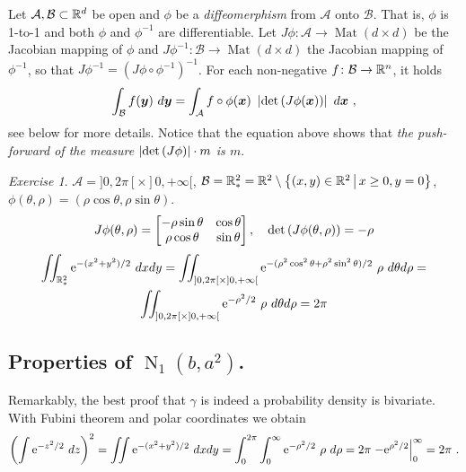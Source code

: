 \documentclass[12pt,a4paper]{amsart}
\newcommand{\Mof}[1]{\operatorname{Mat}\left(#1\times#1\right)}
\newcommand{\by}{\bm y}
\newcommand{\gaussian}[3]{\operatorname{N}_{#1}\left(#2,#3\right)}
\theoremstyle{plain}%
\theoremstyle{definition}
\theoremstyle{remark}
\newtheorem{exercise}{Exercise}
\begin{document}
Let $\mathcal A, \mathcal B \subset \mathbb{R}^d$ be open and $\phi$ be a
\emph{diffeomerphism} from $\mathcal A$ onto $\mathcal B$. That is,
$\phi$ is 1-to-1 and both $\phi$ and $\phi^{-1}$ are differentiable.
Let $J\phi \colon \mathcal A \to \Mof d$ be the Jacobian mapping of
$\phi$ and $J\phi^{-1} \colon \mathcal B \to \Mof d$ the Jacobian
mapping of $\phi^{-1}$, so that
$J\phi^{-1} = \left(J\phi\circ \phi^{-1}\right)^{-1}$. For each
non-negative $f \colon \mathcal B \to \mathbb{R}^n$, it holds
  \begin{equation*}\label{eq:change}
    \int_{\mathcal B} f(\by) \ d\by = \int_{\mathcal A} f\circ\phi(\bx) \ \absoluteval{\detof{J\phi(\bx)}} \ d\bx \ ,
  \end{equation*}
  see below for more details. Notice that the equation above shows that \emph{the push-forward of the measure $\left\vert\operatorname{det}\left(J\phi\right)\right\vert \cdot m$ is $m$}.
  
\begin{exercise}
  $\mathcal A = ]0,2\pi[\times]0,+\infty[$, $\mathcal B = \mathbb{R}^2_* = \mathbb{R}^2 \setminus \left\{(x,y)\in\mathbb{R}^2 \, \middle| \, x\ge0,y=0 \right\}$, $\phi(\theta,\rho)=(\rho\cos \theta,\rho\sin \theta)$.
\begin{equation*}
  J\phi(\theta,\rho) = \begin{bmatrix}
- \rho \sin\theta & \cos \theta \\ \rho \cos \theta & \sin \theta  \end{bmatrix}
, \quad \operatorname{det}\left(J\phi(\theta,\rho)\right) = - \rho\end{equation*}
\begin{multline*}
\iint_{\mathbb{R}^2_*} \mathrm{e}^{-(x^2+y^2)/2} \ dxdy = \iint_{]0,2\pi[\times]0,+\infty[} \mathrm{e}^{-(\rho^2\cos^2 \theta+ \rho^2 \sin^2 \theta)/2} \ \rho \ d\theta d\rho = \\ \iint_{]0,2\pi[\times]0,+\infty[} \mathrm{e}^{-\rho^2/2} \ \rho \ d\theta d\rho = 2\pi   
\end{multline*}
\end{exercise}

\subsection{Properties of $\gaussian 1 b {a^2}$.}
Remarkably, the best proof that $\gamma$ is indeed a probability
density is bivariate. With Fubini theorem and polar coordinates we
obtain
\begin{equation*}
  \left(\int \mathrm{e}^{-z^2/2} \ dz\right)^2 = \iint \mathrm{e}^{-(x^2+y^2)/2} \ dxdy = \int_0^{2\pi} \int_0^\infty \mathrm{e}^{-\rho^2/2} \ \rho \ d\rho = 2\pi \left. -\mathrm{e}^{\rho^2/2} \right|_0^\infty = 2\pi \ .
  \end{equation*}
\end{document}
